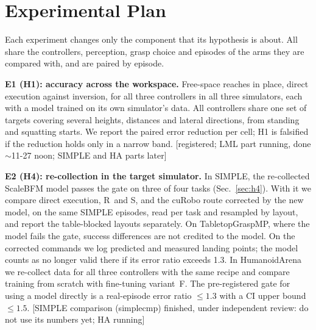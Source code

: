 \documentclass[conference]{IEEEtran}
\newif\ifdraft \drafttrue
\newcommand{\dnote}[1]{\ifdraft{\color{red}\footnotesize[#1]}\fi}
\newcommand{\Sinv}{\textsc{S}} %
\newcommand{\Rr}{\textsc{R}}   %
\begin{document}
\section{Experimental Plan}\label{sec:plan}
Each experiment changes only the component that its hypothesis is about. All share the controllers, perception, grasp choice and episodes of the arms they are compared with, and are paired by episode.

\textbf{E1 (H1): accuracy across the workspace.} Free-space reaches in place, direct execution against inversion, for all three controllers in all three simulators, each with a model trained on its own simulator's data. All controllers share one set of targets covering several heights, distances and lateral directions, from standing and squatting starts. We report the paired error reduction per cell; H1 is falsified if the reduction holds only in a narrow band.
\dnote{registered; LML part running, done $\sim$11-27 noon; SIMPLE and HA parts later}

\textbf{E2 (H4): re-collection in the target simulator.} In SIMPLE, the re-collected ScaleBFM model passes the gate on three of four tasks (Sec.~\ref{sec:h4}). With it we compare direct execution, \Rr\ and \Sinv, and the cuRobo route corrected by the new model, on the same SIMPLE episodes, read per task and resampled by layout, and report the table-blocked layouts separately. On TabletopGraspMP, where the model fails the gate, success differences are not credited to the model. On the corrected commands we log predicted and measured landing points; the model counts as no longer valid there if its error ratio exceeds 1.3. In HumanoidArena we re-collect data for all three controllers with the same recipe and compare training from scratch with fine-tuning variant~F. The pre-registered gate for using a model directly is a real-episode error ratio $\le1.3$ with a CI upper bound $\le1.5$.
\dnote{SIMPLE comparison (simplecmp) finished, under independent review: do not use its numbers yet; HA running}
\end{document}
